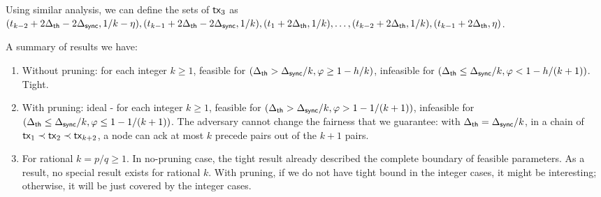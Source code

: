 Using similar analysis, we can define the sets of $\mathsf{tx}_3$ as $(t_{k-2}+2\Delta_{\mathsf{th}}-2\Delta_{\mathsf{sync}}, 1/k-\eta), (t_{k-1}+2\Delta_{\mathsf{th}}-2\Delta_{\mathsf{sync}}, 1/k), (t_1+2\Delta_{\mathsf{th}}, 1/k), \dots, (t_{k-2}+2\Delta_{\mathsf{th}}, 1/k), (t_{k-1}+2\Delta_{\mathsf{th}}, \eta)$.
 
{\color{red} 



A summary of results we have:

\begin{enumerate}
    \item Without pruning: for each integer $k\ge 1$, feasible for $(\Delta_{\mathsf{th}}>\Delta_{\mathsf{sync}}/k, \varphi\ge 1-h/k)$, infeasible for $(\Delta_{\mathsf{th}}\le \Delta_{\mathsf{sync}}/k, \varphi< 1-h/(k+1))$. Tight.  
    \item With pruning: ideal - for each integer $k\ge 1$, feasible for $(\Delta_{\mathsf{th}}>\Delta_{\mathsf{sync}}/k, \varphi> 1-1/(k+1))$, infeasible for $(\Delta_{\mathsf{th}}\le \Delta_{\mathsf{sync}}/k, \varphi\le 1-1/(k+1))$. The adversary cannot change the fairness that we guarantee: with $\Delta_{\mathsf{th}}=\Delta_{\mathsf{sync}}/k$, in a chain of $\mathsf{tx}_1\prec\mathsf{tx}_2\prec \mathsf{tx}_{k+2}$, a node can ack at most $k$ precede pairs out of the $k+1$ pairs.
    \item  For rational $k=p/q\ge 1$. In no-pruning case, the tight result already described the complete boundary of feasible parameters. As a result, no special result exists for rational $k$. With pruning, if we do not have tight bound in the integer cases, it might be interesting; otherwise, it will be just covered by the integer cases.  
\end{enumerate}

}


